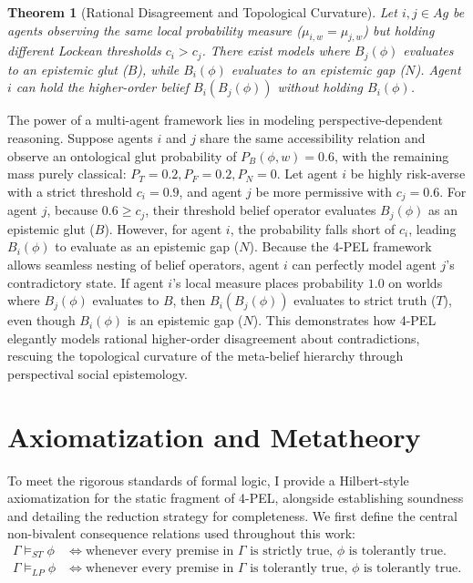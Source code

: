 \documentclass[11pt,a4paper]{article}
\newtheorem{theorem}{Theorem}[section]
\begin{document}
\begin{theorem}[Rational Disagreement and Topological Curvature]
Let $i, j \in Ag$ be agents observing the same local probability measure ($\mu_{i,w} = \mu_{j,w}$) but holding different Lockean thresholds $c_i > c_j$. There exist models where $B_j(\phi)$ evaluates to an epistemic glut ($B$), while $B_i(\phi)$ evaluates to an epistemic gap ($N$). Agent $i$ can hold the higher-order belief $B_i(B_j(\phi))$ without holding $B_i(\phi)$.
\end{theorem}
The power of a multi-agent framework lies in modeling perspective-dependent reasoning. Suppose agents $i$ and $j$ share the same accessibility relation and observe an ontological glut probability of $P_B(\phi, w) = 0.6$, with the remaining mass purely classical: $P_T = 0.2, P_F = 0.2, P_N = 0$.
Let agent $i$ be highly risk-averse with a strict threshold $c_i = 0.9$, and agent $j$ be more permissive with $c_j = 0.6$. For agent $j$, because $0.6 \ge c_j$, their threshold belief operator evaluates $B_j(\phi)$ as an epistemic glut ($B$). However, for agent $i$, the probability falls short of $c_i$, leading $B_i(\phi)$ to evaluate as an epistemic gap ($N$). 
Because the 4-PEL framework allows seamless nesting of belief operators, agent $i$ can perfectly model agent $j$'s contradictory state. If agent $i$'s local measure places probability $1.0$ on worlds where $B_j(\phi)$ evaluates to $B$, then $B_i(B_j(\phi))$ evaluates to strict truth ($T$), even though $B_i(\phi)$ is an epistemic gap ($N$). This demonstrates how 4-PEL elegantly models rational higher-order disagreement about contradictions, rescuing the topological curvature of the meta-belief hierarchy through perspectival social epistemology.

\section{Axiomatization and Metatheory}
\label{sec:metatheorems}

To meet the rigorous standards of formal logic, I provide a Hilbert-style axiomatization for the static fragment of 4-PEL, alongside establishing soundness and detailing the reduction strategy for completeness. We first define the central non-bivalent consequence relations used throughout this work:
\begin{align*}
\Gamma \models_{ST} \phi &\iff \text{whenever every premise in } \Gamma \text{ is strictly true, } \phi \text{ is tolerantly true.} \\
\Gamma \models_{LP} \phi &\iff \text{whenever every premise in } \Gamma \text{ is tolerantly true, } \phi \text{ is tolerantly true.}
\end{align*}
\end{document}
